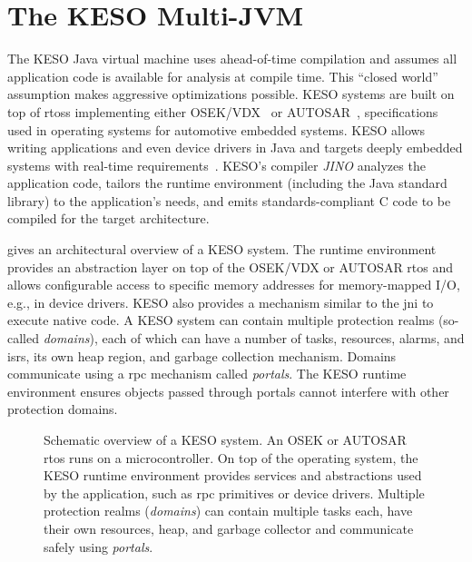 	\section{The KESO Multi-JVM}
		\label{sec:intro:keso}
		The KESO Java virtual machine uses ahead-of-time compilation and assumes all application code is available for
		analysis at compile time. This \enquote{closed world} assumption makes aggressive optimizations possible. KESO
		systems are built on top of \glspl{rtos} implementing either OSEK/VDX~\cite{OSEKSpec223} or
		AUTOSAR~\cite{autosar:06:sws_os}, specifications used in operating systems for automotive embedded systems. KESO
		allows writing applications and even device drivers in Java and targets deeply embedded systems with real-time
		requirements~\cite{thomm:10:jtres}. KESO's compiler \emph{JINO} analyzes the application code, tailors the runtime
		environment (including the Java standard library) to the application's needs, and emits standards-compliant C code
		to be compiled for the target architecture.

		 gives an architectural overview of a KESO system. The runtime environment provides an
		abstraction layer on top of the OSEK/VDX or AUTOSAR \gls{rtos} and allows configurable access to specific memory
		addresses for memory-mapped I/O, e.g., in device drivers. KESO also provides a mechanism similar to the \gls{jni} to
		execute native code. A KESO system can contain multiple protection realms (so-called \emph{domains}), each of which
		can have a number of tasks, resources, alarms, and \glspl{isr}, its own heap region, and garbage collection
		mechanism. Domains communicate using a \gls{rpc} mechanism called \emph{portals}. The KESO runtime environment
		ensures objects passed through portals cannot interfere with other protection domains.

		\begin{figure}
			\begin{center}
				
			\end{center}
			\caption[Schematic overview of a KESO system]{%
				Schematic overview of a KESO system. An OSEK or AUTOSAR \gls{rtos} runs on a microcontroller. On top of the
				operating system, the KESO runtime environment provides services and abstractions used by the application, such
				as \gls{rpc} primitives or device drivers. Multiple protection realms (\emph{domains}) can contain multiple
				tasks each, have their own resources, heap, and garbage collector and communicate safely using \emph{portals}.}
			\label{fig:intro:overview}
		\end{figure}

